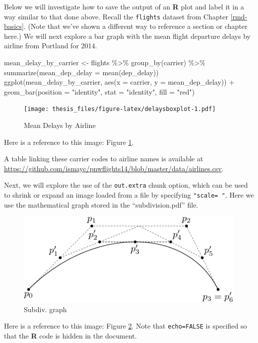 \documentclass[12pt,twoside]{reedthesis}
\newenvironment{Shaded}{\begin{snugshade}}{\end{snugshade}}
\newcommand{\AttributeTok}[1]{\textcolor[rgb]{0.77,0.63,0.00}{#1}}
\newcommand{\FunctionTok}[1]{\textcolor[rgb]{0.00,0.00,0.00}{#1}}
\newcommand{\NormalTok}[1]{#1}
\newcommand{\OtherTok}[1]{\textcolor[rgb]{0.56,0.35,0.01}{#1}}
\newcommand{\SpecialCharTok}[1]{\textcolor[rgb]{0.00,0.00,0.00}{#1}}
\newcommand{\StringTok}[1]{\textcolor[rgb]{0.31,0.60,0.02}{#1}}
\begin{document}
\clearpage

Below we will investigate how to save the output of an \textbf{R} plot and label it in a way similar to that done above. Recall the \texttt{flights} dataset from Chapter \ref{rmd-basics}. (Note that we've shown a different way to reference a section or chapter here.) We will next explore a bar graph with the mean flight departure delays by airline from Portland for 2014.
\begin{Shaded}
\begin{Highlighting}[]
\NormalTok{mean\_delay\_by\_carrier }\OtherTok{\textless{}{-}}\NormalTok{ flights }\SpecialCharTok{\%\textgreater{}\%}
  \FunctionTok{group\_by}\NormalTok{(carrier) }\SpecialCharTok{\%\textgreater{}\%}
  \FunctionTok{summarize}\NormalTok{(}\AttributeTok{mean\_dep\_delay =} \FunctionTok{mean}\NormalTok{(dep\_delay))}
\FunctionTok{ggplot}\NormalTok{(mean\_delay\_by\_carrier, }\FunctionTok{aes}\NormalTok{(}\AttributeTok{x =}\NormalTok{ carrier, }\AttributeTok{y =}\NormalTok{ mean\_dep\_delay)) }\SpecialCharTok{+}
  \FunctionTok{geom\_bar}\NormalTok{(}\AttributeTok{position =} \StringTok{"identity"}\NormalTok{, }\AttributeTok{stat =} \StringTok{"identity"}\NormalTok{, }\AttributeTok{fill =} \StringTok{"red"}\NormalTok{)}
\end{Highlighting}
\end{Shaded}
\begin{figure}
\centering
\texttt{[image: thesis\_files/figure-latex/delaysboxplot-1.pdf]}
\caption{\label{fig:delaysboxplot}Mean Delays by Airline}
\end{figure}
Here is a reference to this image: Figure \ref{fig:delaysboxplot}.

A table linking these carrier codes to airline names is available at \url{https://github.com/ismayc/pnwflights14/blob/master/data/airlines.csv}.

\clearpage

Next, we will explore the use of the \texttt{out.extra} chunk option, which can be used to shrink or expand an image loaded from a file by specifying \texttt{"scale=\ "}. Here we use the mathematical graph stored in the ``subdivision.pdf'' file.
\begin{figure}
\includegraphics[scale=0.75]{figure/subdivision} \caption{Subdiv. graph}\label{fig:subd}
\end{figure}
Here is a reference to this image: Figure \ref{fig:subd}. Note that \texttt{echo=FALSE} is specified so that the \textbf{R} code is hidden in the document.
\end{document}
